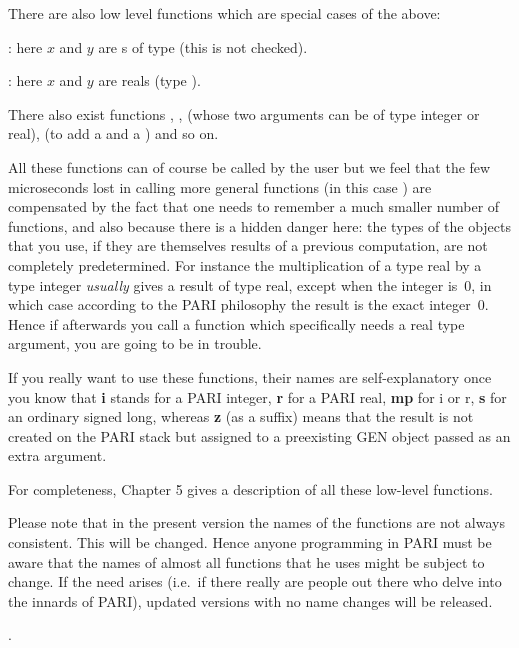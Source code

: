 
\noindent There are also low level functions which are special cases of the
above:

: here $x$ and $y$ are s of type
 (this is not checked).

: here $x$ and $y$ are  reals
(type ).

\noindent
There also exist functions , ,  (whose
two arguments can be of type integer or real),  (to add a 
and a ) and so on.

All these functions can of course be called by the user but we feel that
the few microseconds lost in calling more general functions (in this case
) are compensated by the fact that one needs to remember a much
smaller number of functions, and also because there is a hidden danger here:
the types of the objects that you use, if they are themselves results of a
previous computation, are not completely predetermined. For instance the
multiplication of a type real  by a type integer 
\emph{usually} gives a result of type real, except when the integer is~0, in
which case according to the PARI philosophy the result is the exact integer~0.
Hence if afterwards you call a function which specifically needs a real
type argument, you are going to be in trouble.

If you really want to use these functions, their names are self-explanatory
once you know that {\bf i} stands for a PARI integer, {\bf r} for a PARI
real, {\bf mp} for i or r, {\bf s} for an ordinary signed long, whereas {\bf
z} (as a suffix) means that the result is not created on the PARI
stack but assigned to a preexisting GEN object passed as an extra argument.

For completeness, Chapter 5 gives a description of all these
low-level functions.

Please note that in the present version \vers{} the names of the functions
are not always consistent. This will be changed. Hence anyone programming in
PARI must be aware that the names of almost all functions that he uses might
be subject to change. If the need arises (i.e.~if there really are people out
there who delve into the innards of PARI), updated versions with no name
changes will be released.

.

